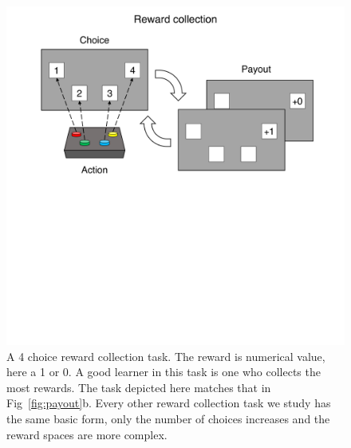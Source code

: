 \begin{figure}
	\begin{fullwidth}
	\includegraphics[width=.55\linewidth]{img/task_outline2.pdf} 
	\caption{A 4 choice reward collection task. The reward is numerical value, here a 1 or 0. A good learner in this task is one who collects the most rewards. The task depicted here matches that in Fig~\ref{fig:payout}b. Every other reward collection task we study has the same basic form, only the number of choices increases and the reward spaces are more complex.}
	\label{fig:task_outline2} 
	\end{fullwidth}
\end{figure}

